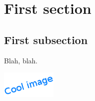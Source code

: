 \documentclass[a4paper, 11pt, oneside]{article}
\begin{document}
% 

\tableofcontents
\newpage

\section{First section}

\subsection{First subsection}

Blah, blah. \\

\centerline{\includegraphics{img/first_image.png}}
\end{document}
